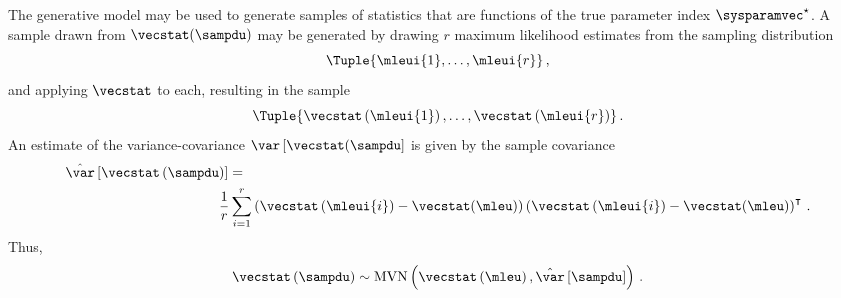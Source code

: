 \documentclass[../main.tex]{subfiles}
\begin{document}
The generative model may be used to generate samples of statistics that are functions of the true parameter index $\tparam\sysparamvec$.
A sample drawn from $\vecstat(\sampdu)$ may be generated by drawing $r$ maximum likelihood estimates from the sampling distribution
\begin{equation}
\Tuple{\mleui{1}, \ldots, \mleui{r}}\,,
\end{equation}
and applying $\vecstat$ to each, resulting in the sample
\begin{equation}
\label{eq:phi_sample}
\Tuple{
\vecstat\left(\mleui{1}\right),
\ldots,
\vecstat\left(\mleui{r}\right)}\,.
\end{equation}
An estimate of the variance-covariance $\var\left[\vecstat(\sampdu\right]$ is given by the sample covariance
\begin{equation}
\begin{split}
\estimator{\var}\left[\vecstat\left(\sampdu\right)\right] &=\\
& \!\!\!\! \frac{1}{r} \sum_{i=1}^{r}
\left(\vecstat\left(\mleui{i}\right) - \vecstat(\mleu)\right)
\left(\vecstat\left(\mleui{i}\right) - \vecstat(\mleu)\right)^\intercal\,.
\end{split}
\end{equation}
Thus,
\begin{equation}
\vecstat\left(\sampdu\right) \sim \mvn\left(\vecstat\left(\mleu\right), \estimator{\var}\left[\sampdu\right] \right)\,.
\end{equation}
\end{document}
